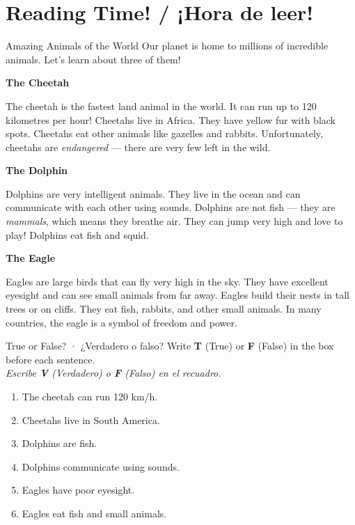 
\section{Reading Time! / ¡Hora de leer!}

\begin{readingbox}{Amazing Animals of the World}
Our planet is home to millions of incredible animals. Let's learn about three of them!

\medskip
\textbf{The Cheetah}

The cheetah is the fastest land animal in the world. It can run up to 120 kilometres per hour! Cheetahs live in Africa. They have yellow fur with black spots. Cheetahs eat other animals like gazelles and rabbits. Unfortunately, cheetahs are \textit{endangered} --- there are very few left in the wild.

\medskip
\textbf{The Dolphin}

Dolphins are very intelligent animals. They live in the ocean and can communicate with each other using sounds. Dolphins are not fish --- they are \textit{mammals}, which means they breathe air. They can jump very high and love to play! Dolphins eat fish and squid.

\medskip
\textbf{The Eagle}

Eagles are large birds that can fly very high in the sky. They have excellent eyesight and can see small animals from far away. Eagles build their nests in tall trees or on cliffs. They eat fish, rabbits, and other small animals. In many countries, the eagle is a symbol of freedom and power.
\end{readingbox}

\vspace{14pt}

\begin{activity}{True or False? · ¿Verdadero o falso?}
Write \textbf{T} (True) or \textbf{F} (False) in the box before each sentence. \\
\textit{Escribe \textbf{V} (Verdadero) o \textbf{F} (Falso) en el recuadro.}

\medskip
\begin{enumerate}
  \item \fbox{\phantom{XX}} The cheetah can run 120 km/h.
  \item \fbox{\phantom{XX}} Cheetahs live in South America.
  \item \fbox{\phantom{XX}} Dolphins are fish.
  \item \fbox{\phantom{XX}} Dolphins communicate using sounds.
  \item \fbox{\phantom{XX}} Eagles have poor eyesight.
  \item \fbox{\phantom{XX}} Eagles eat fish and small animals.
\end{enumerate}
\end{activity}

